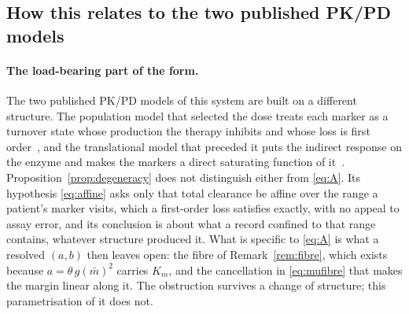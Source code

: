 \subsection{How this relates to the two published PK/PD models}

\paragraph{The load-bearing part of the form.}
\label{sec:structure}
The two published PK/PD models of this system are built on a different structure. The
population model that selected the dose treats each marker as a turnover state whose
production the therapy inhibits and whose loss is first
order~\cite{dose_selection_poster}, and the translational model that preceded it puts the
indirect response on the enzyme and makes the markers a direct saturating function of
it~\cite{pkpd_translational}. %
Proposition~\ref{prop:degeneracy} does not distinguish either from \eqref{eq:A}. Its
hypothesis \eqref{eq:affine} asks only that total clearance be affine over the range a
patient's marker visits, which a first-order loss satisfies exactly, with no appeal to
assay error, and its conclusion is about what a record confined to that range contains,
whatever structure produced it. What is specific to \eqref{eq:A} is what a
resolved $(a,b)$ then leaves open: the fibre of Remark~\ref{rem:fibre}, which exists because
$a = \theta\, g(\bar m)^2$ carries $K_m$, and the cancellation in \eqref{eq:mufibre} that
makes the margin linear along it. The obstruction survives a change of structure; this
parametrisation of it does not.

